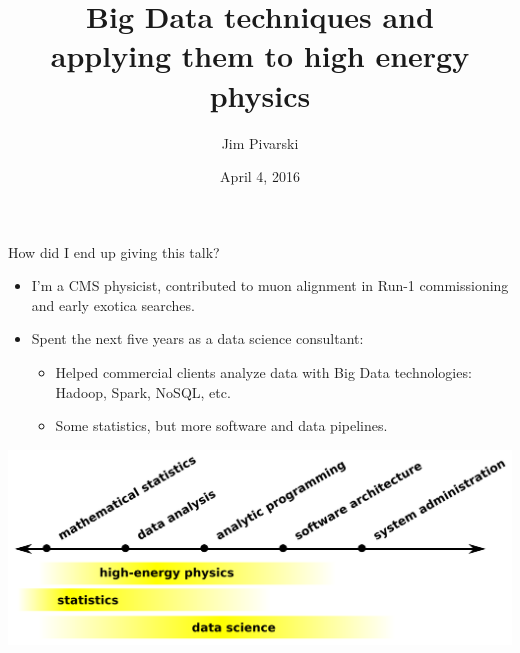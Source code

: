 \documentclass{beamer}
\title[2016-04-04-offline-pr-overview]{Big Data techniques and \\ applying them to high energy physics}
\author{Jim Pivarski}
\institute{Princeton University -- DIANA}
\date{April 4, 2016}
\begin{document}
\begin{frame}
  \titlepage
\end{frame}


\begin{frame}{How did I end up giving this talk?}
\begin{itemize}
\item I'm a CMS physicist, contributed to muon alignment in Run-1 commissioning and early exotica searches.
\item Spent the next five years as a data science consultant:
\begin{itemize}
\item Helped commercial clients analyze data with Big Data technologies: Hadoop, Spark, NoSQL, etc.
\item Some statistics, but more software and data pipelines.
\end{itemize}
\end{itemize}

\includegraphics[width=\linewidth]{spectrum_of_data_science.png}

\end{frame}
\end{document}
